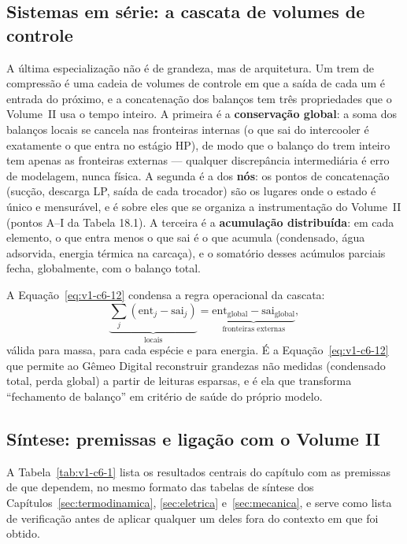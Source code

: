 \documentclass[12pt,a4paper]{article}
\numberwithin{equation}{section}
\numberwithin{table}{section}
\numberwithin{figure}{section}
\begin{document}
\subsection{Sistemas em série: a cascata de volumes de
controle}\label{sub:v1-c6-cascata}

A última especialização não é de grandeza, mas de arquitetura. Um trem de
compressão é uma cadeia de volumes de controle em que a saída de cada um é
entrada do próximo, e a concatenação dos balanços tem três propriedades que o
Volume~II usa o tempo inteiro. A primeira é a \textbf{conservação global}: a
soma dos balanços locais se cancela nas fronteiras internas (o que sai do
intercooler é exatamente o que entra no estágio HP), de modo que o balanço do
trem inteiro tem apenas as fronteiras externas --- qualquer discrepância
intermediária é erro de modelagem, nunca física. A segunda é a dos
\textbf{nós}: os pontos de concatenação (sucção, descarga LP, saída de cada
trocador) são os lugares onde o estado é único e mensurável, e é sobre eles
que se organiza a instrumentação do Volume~II (pontos A--I da Tabela 18.1). A
terceira é a \textbf{acumulação distribuída}: em cada elemento, o que entra
menos o que sai é o que acumula (condensado, água adsorvida, energia térmica
na carcaça), e o somatório desses acúmulos parciais fecha, globalmente, com o
balanço total.

A Equação~\eqref{eq:v1-c6-12} condensa a regra operacional da cascata:
\begin{equation}\label{eq:v1-c6-12}
\underbrace{\sum_j \left( \text{ent}_j - \text{sai}_j \right)}_{\text{locais}} =
\underbrace{\text{ent}_{\text{global}} - \text{sai}_{\text{global}}}_{\text{fronteiras externas}} ,
\end{equation}
válida para massa, para cada espécie e para energia. É a
Equação~\eqref{eq:v1-c6-12} que permite ao Gêmeo Digital reconstruir grandezas
não medidas (condensado total, perda global) a partir de leituras esparsas, e
é ela que transforma ``fechamento de balanço'' em critério de saúde do
próprio modelo.

\subsection{Síntese: premissas e ligação com o Volume
II}\label{sub:v1-c6-sintese}

A Tabela~\ref{tab:v1-c6-1} lista os resultados centrais do capítulo com as
premissas de que dependem, no mesmo formato das tabelas de síntese dos
Capítulos~\ref{sec:termodinamica}, \ref{sec:eletrica} e~\ref{sec:mecanica},
e serve como lista de verificação antes de aplicar qualquer um deles fora do
contexto em que foi obtido.
\end{document}
